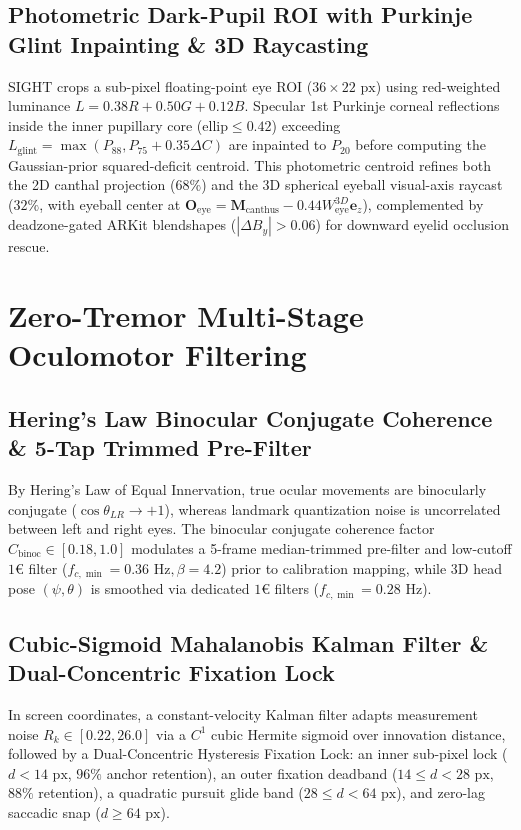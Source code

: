 \documentclass[twocolumn,10pt]{article}
\begin{document}
\subsection{Photometric Dark-Pupil ROI with Purkinje Glint Inpainting \& 3D Raycasting}
SIGHT crops a sub-pixel floating-point eye ROI ($36 \times 22\text{ px}$) using red-weighted luminance $L = 0.38 R + 0.50 G + 0.12 B$. Specular 1st Purkinje corneal reflections inside the inner pupillary core ($\text{ellip} \le 0.42$) exceeding $L_{\text{glint}} = \max(P_{88}, P_{75} + 0.35\Delta C)$ are inpainted to $P_{20}$ before computing the Gaussian-prior squared-deficit centroid. This photometric centroid refines both the 2D canthal projection ($68\%$) and the 3D spherical eyeball visual-axis raycast ($32\%$, with eyeball center at $\mathbf{O}_{\text{eye}} = \mathbf{M}_{\text{canthus}} - 0.44 W_{\text{eye}}^{3D} \mathbf{e}_z$), complemented by deadzone-gated ARKit blendshapes ($|\Delta B_y| > 0.06$) for downward eyelid occlusion rescue.

\section{Zero-Tremor Multi-Stage Oculomotor Filtering}

\subsection{Hering's Law Binocular Conjugate Coherence \& 5-Tap Trimmed Pre-Filter}
By Hering's Law of Equal Innervation, true ocular movements are binocularly conjugate ($\cos\theta_{LR} \to +1$), whereas landmark quantization noise is uncorrelated between left and right eyes. The binocular conjugate coherence factor $C_{\text{binoc}} \in [0.18, 1.0]$ modulates a 5-frame median-trimmed pre-filter and low-cutoff $1\text{€}$ filter ($f_{c,\min} = 0.36\text{ Hz}, \beta = 4.2$) prior to calibration mapping, while 3D head pose $(\psi, \theta)$ is smoothed via dedicated $1\text{€}$ filters ($f_{c,\min} = 0.28\text{ Hz}$).

\subsection{Cubic-Sigmoid Mahalanobis Kalman Filter \& Dual-Concentric Fixation Lock}
In screen coordinates, a constant-velocity Kalman filter adapts measurement noise $R_k \in [0.22, 26.0]$ via a $C^1$ cubic Hermite sigmoid over innovation distance, followed by a Dual-Concentric Hysteresis Fixation Lock: an inner sub-pixel lock ($d < 14\text{ px}$, $96\%$ anchor retention), an outer fixation deadband ($14 \le d < 28\text{ px}$, $88\%$ retention), a quadratic pursuit glide band ($28 \le d < 64\text{ px}$), and zero-lag saccadic snap ($d \ge 64\text{ px}$).
\end{document}
